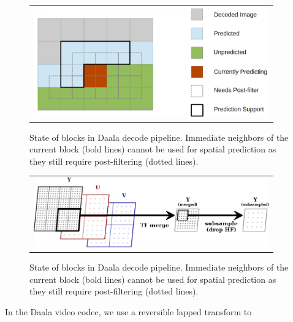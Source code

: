 \documentclass[a4paper]{spie}  %
\begin{document}
\begin{figure}
\begin{center}
\begin{tabular}{c}
\includegraphics[natwidth=1376,natheight=646,width=4in]{daala_decode.png}
\end{tabular}
\end{center}
\caption[example]{\label{fig:decode} State of blocks in Daala decode pipeline.
 Immediate neighbors of the current block (bold lines) cannot be used for
 spatial prediction as they still require post-filtering (dotted lines).}
\end{figure}

\begin{figure}
\begin{center}
\begin{tabular}{c}
\includegraphics[natwidth=799,natheight=237,width=4in]{CfL-TF.png}
\end{tabular}
\end{center}
\caption[example]{\label{fig:decode} State of blocks in Daala decode pipeline.
 Immediate neighbors of the current block (bold lines) cannot be used for
 spatial prediction as they still require post-filtering (dotted lines).}
\end{figure}

In the Daala video codec, we use a reversible lapped transform to 
\end{document}
